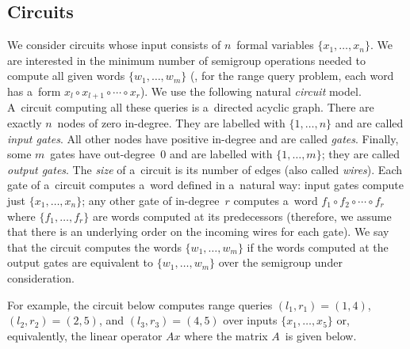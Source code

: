 \documentclass{toc}
\begin{document}
\subsection{Circuits}\label{subsec:circuits}
We consider circuits whose input consists of $n$~formal variables
$\{x_1, \dotsc, x_n\}$. We are interested in the minimum number of semigroup
operations needed to compute all given words $\{w_1, \dotsc, w_m\}$ (\eg, for
the range query problem, 
each word has a~form $x_l\circ x_{l+1}\circ \dotsb \circ x_r$).
We use
the following natural \emph{circuit} model. A~circuit computing all these queries
is a~directed acyclic graph. There are exactly $n$~nodes of zero in-degree. They
are labelled with $\{1, \dotsc, n\}$ and are called \emph{input gates}. All
other nodes have positive in-degree and are called \emph{gates}.
Finally, some
$m$~gates have out-degree~0 and are labelled with $\{1, \dotsc, m\}$; they are
called \emph{output gates}.
The
\emph{size} of a~circuit is its number of edges (also called \emph{wires}). Each
gate of a~circuit computes a~word defined in a~natural way: input gates compute
just $\{x_1, \dotsc, x_n\}$; any other gate of in-degree~$r$ computes a~word
$f_1 \circ f_2 \circ \dotsb \circ f_r$ where $\{f_1, \dotsc, f_r\}$ are words
computed at its predecessors (therefore, we assume that there is an underlying
order on the incoming wires for each gate). We say that the circuit computes the
words $\{w_1, \dotsc, w_m\}$ if the words computed at the output gates are
equivalent to $\{w_1, \dotsc, w_m\}$ over the %
semigroup under consideration.  %

For example, the circuit below computes range queries
$(l_1,r_1)=(1,4)$,
$(l_2,r_2)=(2,5)$, and
$(l_3,r_3)=(4,5)$
over inputs $\{x_1, \dotsc, x_5\}$ or, equivalently, the
linear operator $Ax$ where the matrix $A$~is given below.

\vspace{5mm}
\begin{center}
\end{center}
\vspace{5mm}
\end{document}
